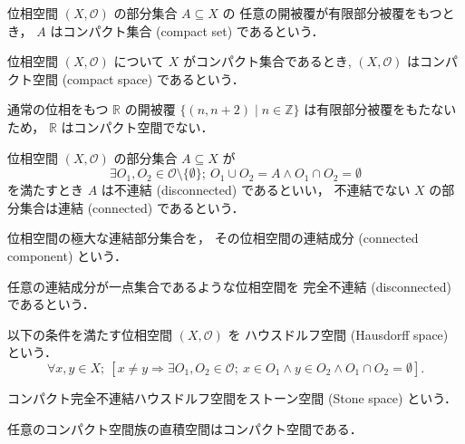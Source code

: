 \documentclass[titlepage]{ltjsreport}
\begin{document}
\begin{definition}[コンパクト集合]
  位相空間 $(X,\mathcal{O})$ の部分集合 $A\subseteq X$ の
  任意の開被覆が有限部分被覆をもつとき，
  $A$ はコンパクト集合 (compact set) であるという．
\end{definition}

\begin{definition}[コンパクト空間]
  位相空間 $(X,\mathcal{O})$ について $X$ がコンパクト集合であるとき,
  $(X,\mathcal{O})$ はコンパクト空間 (compact space) であるという．
\end{definition}

\begin{example}
  通常の位相をもつ
  $\mathbb{R}$
  の開被覆
  $\{(n,n+2)\mid n\in\mathbb{Z}\}$
  は有限部分被覆をもたないため，
  $\mathbb{R}$
  はコンパクト空間でない．
\end{example}

\begin{definition}[連結，不連結]
  位相空間 $(X,\mathcal{O})$ の部分集合 $A\subseteq X$ が
  \begin{equation}
    \exists O_1,O_2\in\mathcal{O}\setminus\{\emptyset\};
    \ O_1\cup O_2=A\wedge O_1\cap O_2=\emptyset
  \end{equation}
  を満たすとき $A$ は不連結 (disconnected) であるといい，
  不連結でない $X$ の部分集合は連結 (connected) であるという．
\end{definition}

\begin{definition}[連結成分]
  位相空間の極大な連結部分集合を，
  その位相空間の連結成分 (connected component) という．
\end{definition}

\begin{definition}[完全不連結]
  任意の連結成分が一点集合であるような位相空間を
  完全不連結 (disconnected) であるという．
\end{definition}

\begin{definition}[ハウスドルフ空間]
  以下の条件を満たす位相空間 $(X,\mathcal{O})$ を
  ハウスドルフ空間 (Hausdorff space) という．
  \begin{equation}
    \forall x,y\in X;
    \ \left[x\neq y\Longrightarrow\exists O_1,O_2\in\mathcal{O};
      \ x\in O_1\wedge y\in O_2\wedge O_1\cap O_2=\emptyset\right].
  \end{equation}
\end{definition}

\begin{definition}[ストーン空間]\label{def:stone-space}
  コンパクト完全不連結ハウスドルフ空間をストーン空間 (Stone space) という．
\end{definition}

\begin{theorem}[チコノフの定理]
  任意のコンパクト空間族の直積空間はコンパクト空間である．
\end{theorem}
\end{document}
